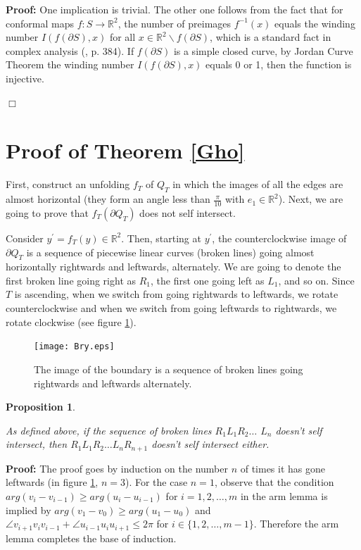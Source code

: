 \documentclass[openright, 12pt]{article}
\newtheorem{prop}[teorema]{Proposition}
\newcommand{\field}[1]{\ensuremath{\mathbb{#1}}}
\newcommand{\R}{\field{R}}
\begin{document}
\textbf{Proof: }One implication is trivial. The other one follows from the fact that for conformal maps $f: S \rightarrow \mathbb{R}^2$, the number of preimages $f^{-1}(x)$ equals the winding number $I(f(\partial S), x )$ for all $x \in \R^2  \backslash f(\partial S)$, which is a standard fact in complex analysis (\cite{Ma}, p. 384). If $f(\partial S)$ is a simple closed curve, by Jordan Curve Theorem \cite{Ha} the winding number $I(f(\partial S), x )$ equals 0 or 1, then the function is injective.


\hfill $\Box$

\section*{Proof of Theorem \ref{Gho}}

First, construct an unfolding $f_T$ of $Q_T$ in which the images of all the edges are almost horizontal (they form an angle less than $\frac{\pi}{10}$ with $e_1 \in \R ^2$). Next, we are going to prove that $f_T(\partial Q_T)$ does not self intersect.

Consider $y^{\prime} = f_T(y) \in \R ^2$. Then, starting at $y^{\prime}$, the counterclockwise image of $\partial Q_T$ is a sequence of piecewise linear curves (broken lines) going almost horizontally rightwards and leftwards, alternately. We are going to denote the first broken line going right as $R_1$, the first one going left as $L_1$, and so on. Since $T$ is ascending, when we switch from going rightwards to leftwards, we rotate counterclockwise and when we switch from going leftwards to rightwards, we rotate clockwise (see figure \ref{Cro}). 



\begin{figure}[h]
\centering
{}
\texttt{[image: Bry.eps]}
\caption{The image of the boundary is a sequence of broken lines going rightwards and leftwards alternately.}\label{Cro}
\end{figure}




\begin{prop}\label{Zig}
{\rm As defined above, if the sequence of broken lines $R_1L_1R_2\ldots$ 
$ L_n$ doesn't self intersect, then $R_1L_1 R_2 \ldots L_nR_{n+1}$ doesn't self intersect either.  

}
\end{prop}




\textbf{Proof: }The proof goes by induction on the number $n$ of times it has gone leftwards (in figure \ref{Cro}, $n=3$). For the case $n=1$, observe that the condition $arg (v_{i} - v_{i-1} )\geq arg (u_{i} - u_{i-1})$ for $i =1, 2, \ldots, m$ in the arm lemma is implied by $arg (v_1 - v_0 )\geq arg (u_1 - u_0)$ and $\angle v_{i+1}v_iv_{i-1}+ \angle u_{i-1}u_iu_{i+1} \leq 2\pi$ for $i\in \{ 1,2, \ldots, m-1\}$. Therefore the arm lemma completes the base of induction.
\end{document}
